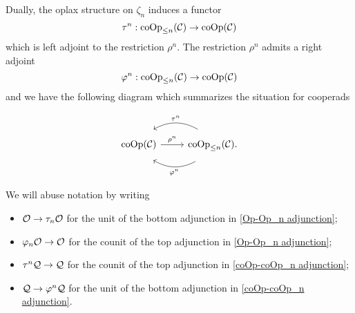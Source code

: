     
    Dually, the oplax structure on $\zeta_n$ induces a functor
    $$
    \tau^{n}:\operatorname{coOp}_{\leq n}({\mathcal{C}})
    \to 
    \operatorname{coOp}({\mathcal{C}})
    $$
    which is left adjoint to the restriction $\rho^n$. The restriction $\rho^n$ admits a right adjoint
    $$
    \varphi^{n}: \operatorname{coOp}_{\leq n}({\mathcal{C}})
    \to 
    \operatorname{coOp}({\mathcal{C}})
    $$
    and we have the following diagram which summarizes the situation for cooperads
    
    \begin{equation}
\label{coOp-coOp_n adjunction}
	\begin{tikzcd}
\Coop(\CC) & \operatorname{coOp}_{\leq n}(\CC)
	\arrow[from=1-2, to= 1-1, bend right, shift right = 3, "\tau^n" above]
	\arrow[from=1-2, to=1-1, bend left, shift left = 3, "\varphi^n" below]
	\arrow[from=1-1, to=1-2, "\rho^n"].
\end{tikzcd}
\end{equation}


\begin{notation}
	We will abuse notation by writing 
	\begin{itemize}
	    \item 
	${\mathcal{O}} \to \tau_{n} {\mathcal{O}}$
	for the unit of the bottom adjunction in \eqref{Op-Op_n adjunction};
	\item $
	\varphi_n {\mathcal{O}} \to {\mathcal{O}}
	$ for the counit of the top adjunction in \eqref{Op-Op_n adjunction};
	\item 	$\tau^n {\mathcal{Q}} \to {\mathcal{Q}}$ for the counit of the top adjunction in \eqref{coOp-coOp_n adjunction};
	\item 	$
	{\mathcal{Q}} \to \varphi^n {\mathcal{Q}}
	$
	for the unit of the bottom adjunction in \eqref{coOp-coOp_n adjunction}.
	\end{itemize}
\end{notation}

